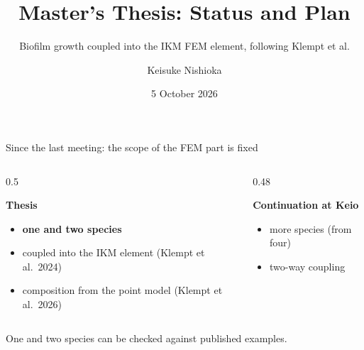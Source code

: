 \documentclass[aspectratio=169,11pt]{beamer}
\title{Master's Thesis: Status and Plan}
\subtitle{Biofilm growth coupled into the IKM FEM element, following Klempt et al.}
\author[Keisuke Nishioka]{Keisuke Nishioka}
\institute[IKM, LUH]{%
\small Institute of Continuum Mechanics (IKM), Leibniz Universit\"at Hannover\\
\small Keio University}
\date{5 October 2026}
\begin{document}
\maketitle


\begin{frame}{Since the last meeting: the scope of the FEM part is fixed}
\begin{columns}[T]
\begin{column}{0.5\textwidth}
\colorbox{c3!12}{\parbox{0.95\linewidth}{%
\textbf{Thesis}\\[3pt]
\begin{itemize}
  \item \textbf{one and two species}
  \item coupled into the IKM element (Klempt et al.\ 2024)
  \item composition from the point model (Klempt et al.\ 2026)
\end{itemize}}}
\end{column}
\begin{column}{0.48\textwidth}
\colorbox{gray!12}{\parbox{0.95\linewidth}{%
\textbf{Continuation at Keio}\\[3pt]
\begin{itemize}
  \item more species (from four)
  \item two-way coupling
\end{itemize}}}
\end{column}
\end{columns}
\vspace{10pt}
\centering\small One and two species can be checked against published examples.
\end{frame}
\end{document}
